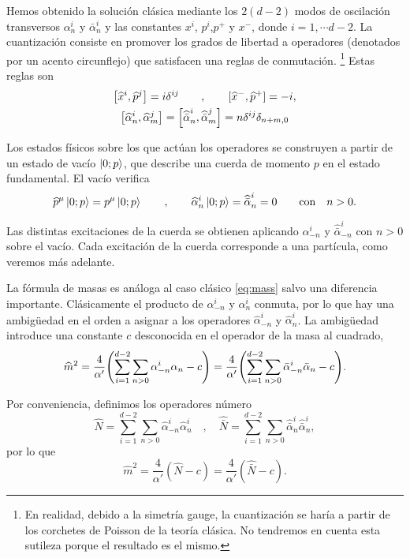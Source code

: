 Hemos obtenido la solución clásica mediante los $2(d-2)$ modos de oscilación transversos 
$\alpha^i_n$ y $\bar \alpha_n^i$ y las constantes $x^i$, $p^i$,$p^+$ y $x^-$, donde $i=1,\cdots d-2$.
La cuantización consiste en promover los grados de libertad a operadores (denotados
por un acento circunflejo) que satisfacen una reglas de conmutación.
\footnote{En realidad, debido a la simetría gauge, la cuantización se haría a partir de los
corchetes de Poisson de la teoría clásica. No tendremos en cuenta esta sutileza porque el
resultado es el mismo.}
Estas reglas son
\begin{equation}
  \begin{gathered}
    \qty[\widehat x^i,\widehat p^j] = i\delta^{ij}\qquad , \qquad [\widehat x^-,\widehat p^+] = -i,\\
    \qty[\widehat \alpha_n^i,\widehat \alpha_m^j]= \qty[\widehat {\bar \alpha}_n^i,\widehat {\bar \alpha}_m^j]= n \delta^{ij}\delta_{n+m,0}
  \end{gathered}
\end{equation}

Los estados físicos sobre los que actúan los operadores se construyen a partir de un estado 
de vacío $\ket{0;p}$, que describe una cuerda de momento $p$ en el estado fundamental.
El vacío verifica
\begin{equation}
  \widehat p^\mu \ket{0;p} = p^\mu \ket{0;p} \qquad, \qquad \widehat \alpha^i_n\ket{0;p}=\widehat {\bar\alpha}^i_n = 0 \qquad \text{con} \quad n>0.
\end{equation}

Las distintas excitaciones de la cuerda se obtienen aplicando $\alpha_{-n}^i$ y $\widehat{\bar\alpha}_{-n}^i$
con $n>0$ sobre el vacío.
Cada excitación de la cuerda corresponde a una partícula, como veremos más adelante.

La fórmula de masas es análoga al caso clásico \ref{eq:mass} salvo una diferencia importante.
Clásicamente el producto de $\alpha^i_{-n}$ y $\alpha^i_n$ conmuta, por lo que hay una 
ambigüedad en el orden a asignar a los operadores $\widehat\alpha^i_{-n}$ y $\widehat \alpha^i_n$.
La ambigüedad introduce una constante $c$ desconocida en el operador de la masa al cuadrado,
\begin{equation}
  \widehat m^2 = \frac{4}{\alpha'}\qty(\sum_{i=1}^{d-2} \sum_{n>0} \alpha_{-n}^i\alpha_n -c)
   = \frac{4}{\alpha'}\qty(\sum_{i=1}^{d-2} \sum_{n>0} \bar \alpha_{-n}^i\bar \alpha_n -c).
\end{equation}

Por conveniencia, definimos los operadores número
\begin{equation}
  \widehat N=\sum_{i=1}^{d-2} \sum_{n>0}\widehat \alpha_{-n}^i\widehat\alpha_n^i \quad , \quad   
  \widehat {\bar N}=\sum_{i=1}^{d-2} \sum_{n>0} \widehat{\bar \alpha}_n^i\widehat{ \bar\alpha}_n^i, 
\end{equation}
por lo que 
\begin{equation}
  \widehat m^2 = \frac{4}{\alpha'} (\widehat N -c ) = \frac{4}{\alpha'} (\widehat{\bar N} -c).
  \label{eq:massdef}
\end{equation}

